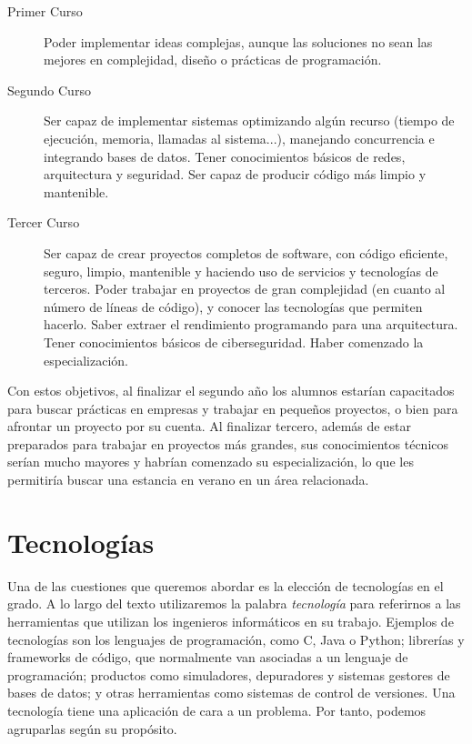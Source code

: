 \begin{description}
    \item[Primer Curso] Poder implementar ideas complejas,
    aunque las soluciones no sean las mejores en
    complejidad, diseño o prácticas de programación.

    \item[Segundo Curso] Ser capaz de implementar sistemas
    optimizando algún recurso
    (tiempo de ejecución, memoria, llamadas al sistema...),
    manejando concurrencia e
    integrando bases de datos.
    Tener conocimientos básicos de redes, arquitectura y seguridad.
    Ser capaz de producir código más limpio y mantenible.

    \item[Tercer Curso] Ser capaz de crear proyectos completos de software,
    con código eficiente, seguro, limpio, mantenible y
    haciendo uso de servicios y tecnologías de terceros.
    Poder trabajar en proyectos de gran complejidad
    (en cuanto al número de líneas de código),
    y conocer las tecnologías que permiten hacerlo.
    Saber extraer el rendimiento programando para una arquitectura.
    Tener conocimientos básicos de ciberseguridad.
    Haber comenzado la especialización.
\end{description}

Con estos objetivos,
al finalizar el segundo año los alumnos estarían capacitados para
buscar prácticas en empresas y trabajar en pequeños proyectos,
o bien para afrontar un proyecto por su cuenta.
Al finalizar tercero,
además de estar preparados para trabajar en proyectos más grandes,
sus conocimientos técnicos serían mucho mayores y
habrían comenzado su especialización,
lo que les permitiría buscar una estancia en verano en un área relacionada.

\section{Tecnologías}

Una de las cuestiones que queremos abordar es
la elección de tecnologías en el grado.
A lo largo del texto utilizaremos la palabra \emph{tecnología} para referirnos a
las herramientas que utilizan los ingenieros informáticos en su trabajo.
Ejemplos de tecnologías son
los lenguajes de programación,
como C, Java o Python;
librerías y frameworks de código,
que normalmente van asociadas a un lenguaje de programación;
productos como simuladores, depuradores y sistemas gestores de bases de datos; y
otras herramientas como sistemas de control de versiones.
Una tecnología tiene una aplicación de cara a un problema.
Por tanto, podemos agruparlas según su propósito.


